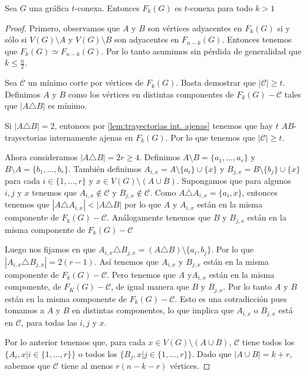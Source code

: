 \begin{teorema}%
\label{teo:F(G) t-conexa}
    Sea $G$ una gr\'afica $t$-conexa. Entonces $F_{k}(G)$ es $t$-conexa para
    todo $k>1$
\end{teorema}
        
\begin{proof}
Primero, observamos que $A$ y $B$ son v\'ertices adyacentes en $F_k(G)$ si y
s\'olo si $V(G) \setminus A$ y $V(G)\setminus B$ son adyacentes en $F_{n-k}(G)$.
Entonces tenemos que $F_k(G) \simeq F_{n-k}(G)$. Por lo tanto asumimos sin
p\'erdida de generalidad que $k \leq \frac{n}{2}$.

Sea $\mathcal{C}$ un m\'i{}nimo corte por v\'ertices de $F_k(G)$. Basta
demostrar que $|\mathcal{C}| \geq t$. Definimos $A$ y $B$ como los v\'ertices en
distintas componentes de $F_k(G)- \mathcal{C}$ tales que $|A \triangle B|$ es
m\'i{}nimo.

Si $|A \triangle B| = 2$, entonces por \cref{lem:trayectorias int. ajenas}
tenemos que hay $t$ $AB$-trayectorias internamente ajenas en $F_k(G)$. Por lo
que tenemos que $|\mathcal{C}| \geq t$.

Ahora consideramos $|A \triangle B| = 2r \geq 4$. Definimos $A \setminus B
=\{a_1, \dots, a_r\}$ y $B \setminus A =\{b_1, \dots, b_r\}$. Tambi\'en
definimos $A_{i,x} = A\setminus \{a_i\} \cup \{x\}$ y $B_{j,x} = B\setminus
\{b_j\} \cup \{x\}$ para cada $i \in \{1, \dots, r\}$ y $x \in V(G)\setminus
(A\cup B)$. Supongamos que para algunos $i, j$ y $x$ tenemos que $A_{i,x} \notin
\mathcal{C}$ y $B_{j,x} \notin \mathcal{C}$. Como $A \triangle A_{i,x} = \{a_i,
x\}$, entonces tenemos que $|A \triangle A_{i,x}|< |A \triangle B|$ por lo que
$A$ y $A_{i,x}$ est\'an en la misma componente de $F_k(G)- \mathcal{C}$.
An\'alogamente tenemos que  $B$ y $B_{j,x}$ est\'an en la misma componente de
$F_k(G)-\mathcal{C}$

Luego nos fijamos en que $A_{i,x} \triangle B_{j,x} = (A \triangle B) \setminus
\{a_i, b_j\}$. Por lo que $|A_{i,x} \triangle B_{j,x}| = 2(r-1)$. As\'i{}
tenemos que $A_{i,x}$ y $B_{j,x}$ est\'an en la misma componente de $F_k(G)-
\mathcal{C}$. Pero tenemos que $A$ y$A_{i,x}$ est\'an en la misma componente, de
$F_K(G) - \mathcal{C}$, de igual manera que $B$ y $B_{j,x}$. Por lo tanto $A$ y
$B$ est\'an en la misma componente de $F_k(G)- \mathcal{C}$. Esto es una
cotradicci\'on pues tomamos a $A$ y $B$ en distintas componentes, lo que implica
que $A_{i,x}$ o $B_{j,x}$ est\'a en $\mathcal{C}$, para todas las $i,j$ y $x$.

Por lo anterior tenemos que, para cada $x \in V(G)\setminus (A \cup B)$,
$\mathcal{C}$ tiene todos los $\{A_i,x | i \in \{1, \dots, r\}\}$ o todos los
$\{B_j,x | j \in \{1, \dots, r\}\}$. Dado que $|A\cup B|=k +r$, sabemos que
$\mathcal{C}$ tiene al menos $r(n-k-r)$ v\'ertices.


\end{proof}
